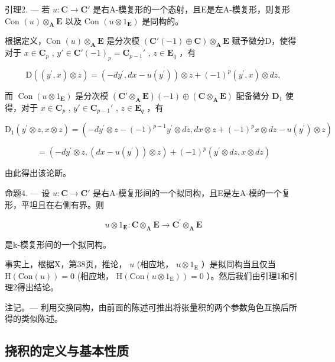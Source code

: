 引理2. --- 若 \(u: \mathbf{C} \to \mathbf{C}'\) 是右A-模复形的一个态射，且E是左A-模复形，则复形Con \((u) \otimes_{\mathbf{A}} \mathbf{E}\) 以及 Con \((u \otimes 1_{\mathbf{E}})\) 是同构的。

根据定义，Con \((u) \otimes_{\mathbf{A}} \mathbf{E}\) 是分次模 \((\mathbf{C}'(-1) \oplus \mathbf{C}) \otimes_{\mathbf{A}} \mathbf{E}\) 赋予微分D，使得对于 \(x \in \mathbf{C}_p\) , \(y' \in \mathbf{C}'(-1)_p = \mathbf{C}_{p-1}'\) , \(z \in \mathbf{E}_q\) ，有

\[
\mathrm{D} ((y ^ {\prime}, x) \otimes z) = (- d y ^ {\prime}, d x - u (y ^ {\prime})) \otimes z + (- 1) ^ {p} (y ^ {\prime}, x) \otimes d z,\tag{4}
\]

而 \(\operatorname{Con}(u \otimes 1_{\mathbf{E}})\) 是分次模 \((\mathbf{C}' \otimes_{\mathbf{A}} \mathbf{E})(-1) \oplus (\mathbf{C} \otimes_{\mathbf{A}} \mathbf{E})\) 配备微分 \(\mathbf{D}_1\) 使得，对于 \(x \in \mathbf{C}_p\) , \(y' \in \mathbf{C}_{p-1}'\) , \(z \in \mathbf{E}_q\) ，有

\[
\mathrm{D} _ {1} \left(y ^ {\prime} \otimes z, x \otimes z\right) = (- d y ^ {\prime} \otimes z - (- 1) ^ {p - 1} y ^ {\prime} \otimes d z, d x \otimes z + (- 1) ^ {p} x \otimes d z - u \left(y ^ {\prime}\right) \otimes z)
\]

\[
= \left(- d y ^ {\prime} \otimes z, (d x - u (y ^ {\prime})) \otimes z\right) + (- 1) ^ {p} \left(y ^ {\prime} \otimes d z, x \otimes d z\right)
\]

由此得出该论断。

命题4. — 设 \(u: \mathbf{C} \to \mathbf{C}'\) 是右A-模复形间的一个拟同构，且E是左A-模的一个复形，平坦且在右侧有界。则

\[
u \otimes 1 _ {\mathbf {E}}: \mathbf {C} \otimes_ {\mathbf {A}} \mathbf {E} \rightarrow \mathbf {C} ^ {\prime} \otimes_ {\mathbf {A}} \mathbf {E}
\]

是k-模复形间的一个拟同构。

事实上，根据X，第38页，推论， \(u\) (相应地， \(u \otimes 1_{\mathrm{E}}\) ）是拟同构当且仅当 \(\mathrm{H}(\mathrm{Con}(u)) = 0\) (相应地， \(\mathrm{H}(\mathrm{Con}(u \otimes 1_{\mathrm{E}})) = 0\) ）。然后我们由引理1和引理2得出结论。

注记。--- 利用交换同构，由前面的陈述可推出将张量积的两个参数角色互换后所得的类似陈述。

\subsection{挠积的定义与基本性质}

